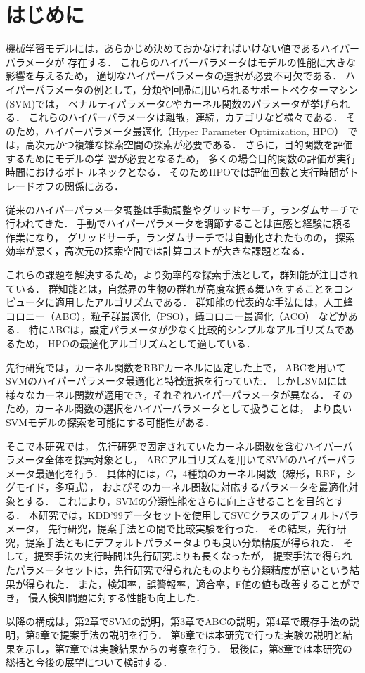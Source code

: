 \section{はじめに}
機械学習モデルには，あらかじめ決めておかなければいけない値であるハイパーパラメータが
存在する．
これらのハイパーパラメータはモデルの性能に大きな影響を与えるため，
適切なハイパーパラメータの選択が必要不可欠である\cite{essential}．
ハイパーパラメータの例として，分類や回帰に用いられるサポートベクターマシン(SVM)では，
ペナルティパラメータ$C$やカーネル関数のパラメータが挙げられる．
これらのハイパーパラメータは離散，連続，カテゴリなど様々である．
そのため，ハイパーパラメータ最適化（Hyper Parameter Optimization, HPO）
では，高次元かつ複雑な探索空間の探索が必要である．
さらに，目的関数を評価するためにモデルの学
習が必要となるため，
多くの場合目的関数の評価が実行時間におけるボト
ルネックとなる．
そのためHPOでは評価回数と実行時間がトレードオフの関係にある\cite{trade}．

従来のハイパーパラメータ調整は手動調整やグリッドサーチ，ランダムサーチで行われてきた．
手動でハイパーパラメータを調節することは直感と経験に頼る作業になり，
グリッドサーチ，ランダムサーチでは自動化されたものの，
探索効率が悪く，高次元の探索空間では計算コストが大きな課題となる．

これらの課題を解決するため，より効率的な探索手法として，群知能が注目されている．
群知能とは，自然界の生物の群れが高度な振る舞いをすることをコンピュータに適用したアルゴリズムである\cite{population}．
群知能の代表的な手法には，人工蜂コロニー（ABC），粒子群最適化（PSO），蟻コロニー最適化（ACO）
などがある．
特にABCは，設定パラメータが少なく比較的シンプルなアルゴリズムであるため，
HPOの最適化アルゴリズムとして適している．

先行研究では，カーネル関数をRBFカーネルに固定した上で，
ABCを用いてSVMのハイパーパラメータ最適化と特徴選択を行っていた\cite{origin}．
しかしSVMには様々なカーネル関数が適用でき，それぞれハイパーパラメータが異なる．
そのため，カーネル関数の選択をハイパーパラメータとして扱うことは，
より良いSVMモデルの探索を可能にする可能性がある．

そこで本研究では，
先行研究で固定されていたカーネル関数を含むハイパーパラメータ全体を探索対象とし，
ABCアルゴリズムを用いてSVMのハイパーパラメータ最適化を行う．
具体的には，$C$，4種類のカーネル関数（線形，RBF，シグモイド，多項式），
およびそのカーネル関数に対応するパラメータを最適化対象とする．
これにより，SVMの分類性能をさらに向上させることを目的とする．
 本研究では，KDD'99データセットを使用してSVCクラスのデフォルトパラメータ，
 先行研究，提案手法との間で比較実験を行った．
その結果，先行研究，提案手法ともにデフォルトパラメータよりも良い分類精度が得られた．
そして，提案手法の実行時間は先行研究よりも長くなったが，
提案手法で得られたパラメータセットは，先行研究で得られたものよりも分類精度が高いという結果が得られた．
また，検知率，誤警報率，適合率，F値の値も改善することができ，
侵入検知問題に対する性能も向上した．

以降の構成は，第2章でSVMの説明，第3章でABCの説明，第4章で既存手法の説明，第5章で提案手法の説明を行う．
第6章では本研究で行った実験の説明と結果を示し，第7章では実験結果からの考察を行う．
最後に，第8章では本研究の総括と今後の展望について検討する．
